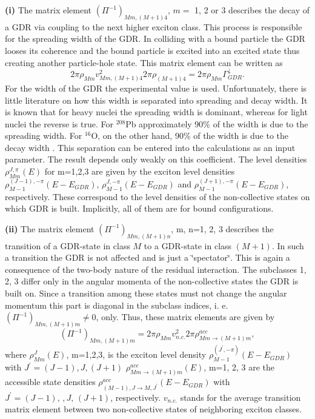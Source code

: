 \documentclass[twocolumn,amsmath,amssymb,10pt,groupedaddress,letter]{revtex4}
\begin{document}
\smallskip
\textbf{(i)} The matrix element $(\Pi^{-1})_{Mm,(M+1)4}$, $m=$ 1,
2 or 3 describes the decay of a GDR via coupling to the next higher
exciton class. This process is responsible for the spreading width
of the GDR. In colliding with a bound particle the GDR looses its
coherence and the bound particle is excited into an excited state
thus creating another particle-hole state. This matrix element can
be written as \begin{equation}
2\pi\rho_{Mm}v_{Mm,(M+1)4}^{2}2\pi\rho_{(M+1)4}=2\pi\rho_{Mm}\Gamma_{GDR}^{\downarrow}.\end{equation}
For the width of the GDR the experimental value is used. Unfortunately,
there is little literature on how this width is separated into spreading
and decay width. It is known that for heavy nuclei the spreading width
is dominant, whereas for light nuclei the reverse is true. For $^{208}$Pb
approximately 90\% of the width is due to the spreading width. For
$^{16}$O, on the other hand, 90\% of the width is due to the decay
width \cite{BBB83}. This separation can be entered into the calculations
as an input parameter. The result depends only weakly on this coefficient.
The level densities $\rho_{Mm}^{J,\pi}(E)$
for m=1,2,3 are given by the exciton level densities $\rho_{M-1}^{(J-1),-\pi}(E-E_{GDR})$,
$\rho_{M-1}^{J,-\pi}(E-E_{GDR})$ and $\rho_{M-1}^{(J+1),-\pi}(E-E_{GDR})$,
respectively. These correspond to the level densities of the non-collective
states on which GDR is built. Implicitly, all of them are for bound
configurations.

\smallskip
\textbf{(ii)} The matrix element $(\Pi^{-1})_{Mm,(M+1)n}$, m, n=1,
2, 3 describes the transition of a GDR-state in class $M$ to a GDR-state
in class $(M+1)$. In such a transition the GDR is not affected and
is just a \char`\"{}spectator\char`\"{}. This is again a consequence
of the two-body nature of the residual interaction. The subclasses
1, 2, 3 differ only in the angular momenta of the non-collective states
the GDR is built on. Since a transition among these states must not
change the angular momentum this part is diagonal in the subclass
indices, i. e. $(\Pi^{-1})_{Mm,(M+1)m}\not=0$, only. Thus, these
matrix elements are given by \begin{equation}
(\Pi^{-1})_{Mm,(M+1)m}=2\pi\rho_{Mm}v_{n.c.}^{2}2\pi\rho_{Mm\rightarrow(M+1)m}^{acc},\end{equation}
where $\rho_{Mm}^{J}(E)$, m=1,2,3, is the exciton level density
$\rho_{M-1}^{(J^{\prime},-\pi)}(E-E_{GDR})$ with $J^{\prime}=(J-1),J,(J+1)$
$\rho_{Mm\rightarrow(M+1)m}^{acc}(E)$, m=1, 2, 3 are the accessible
state densities $\rho_{(M-1),J\rightarrow M,J^{\prime}}^{acc}(E-E_{GDR})$
with $J^{\prime}=(J-1),\,,J,\,(J+1)$, respectively. $v_{n.c.}$ stands
for the average transition matrix element between two non-collective
states of neighboring exciton classes.
\end{document}
